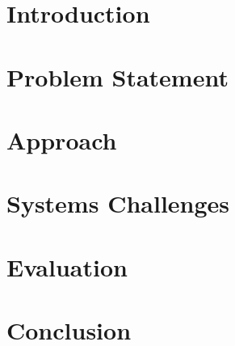 \section{Introduction}
\label{dsec:intro}


\section{Problem Statement}
\label{dsec:problem_statement}


\section{Approach}
\label{dsec:approach}


\section{Systems Challenges}
\label{dsec:implementation}


\section{Evaluation}
\label{dsec:evaluation}


%

% 

\section{Conclusion}
\label{dsec:conclusion}

